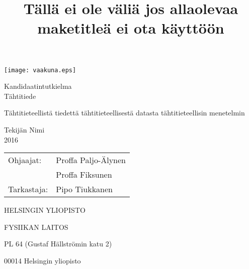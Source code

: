 \documentclass[11pt,a4paper,twoside]{report}
\begin{document}
\begin{titlepage}
\setcounter{page}{1}

\begin{center}

\vspace*{4cm}
\texttt{[image: vaakuna.eps]}

\vspace*{2cm}

Kandidaatintutkielma \\
Tähtitiede

\vspace{2.0cm} 
{\Large \bf
  \rule{0pt}{3ex}Tähtitieteellistä tiedettä tähtitieteellisestä datasta tähtitieteellisin menetelmin
}

\title{
Tällä ei ole väliä jos allaolevaa maketitleä ei ota käyttöön
}

\vspace{2.0cm} 
Tekijän Nimi \\
2016

\vspace{1.5cm} 
\begin{tabular}{ll}	Ohjaajat:	& Proffa Paljo-Älynen \\
								& Proffa Fiksunen \\
			Tarkastaja: & Pipo Tiukkanen
\end{tabular}

\vspace{1.5cm} HELSINGIN YLIOPISTO

FYSIIKAN LAITOS

\vspace{0.5cm} PL 64 (Gustaf Hällströmin katu 2)

00014 Helsingin yliopisto

\end{center}

\end{titlepage}
\end{document}
